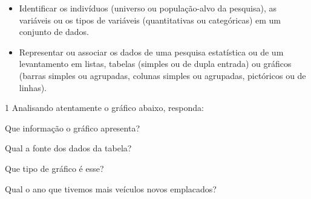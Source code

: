 
\begin{itemize}
\item Identificar os indivíduos (universo ou população-alvo da pesquisa), as
variáveis ou os tipos de variáveis (quantitativas ou categóricas) em um
conjunto de dados.

\item Representar ou associar os dados de uma pesquisa estatística ou de um
levantamento em listas, tabelas (simples ou de dupla entrada) ou
gráficos (barras simples ou agrupadas, colunas simples ou agrupadas,
pictóricos ou de linhas).
\end{itemize}



\num{1} Analisando atentamente o gráfico abaixo, responda:


\begin{escolha}
\item
  Que informação o gráfico apresenta?


\item
  Qual a fonte dos dados da tabela?


\item
  Que tipo de gráfico é esse?


\item
  Qual o ano que tivemos mais veículos novos emplacados?

\end{escolha}

